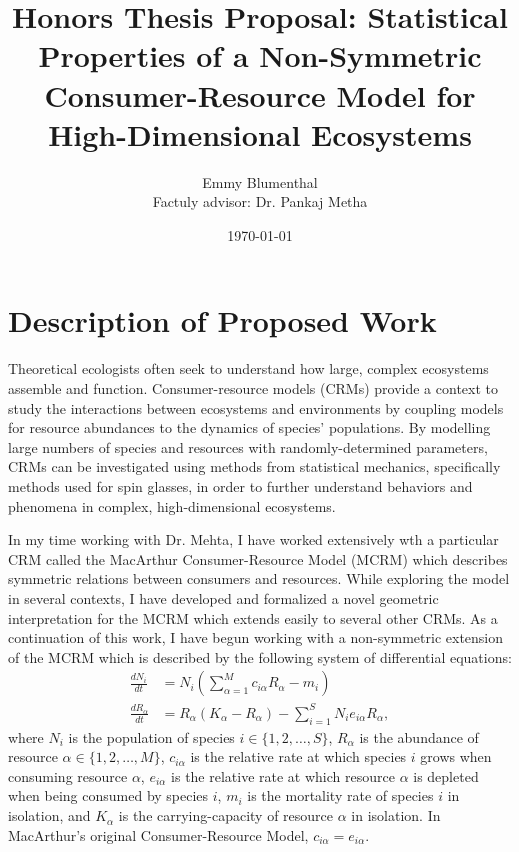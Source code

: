 \documentclass[letterpaper,12pt]{article}
\begin{document}
\title{Honors Thesis Proposal: Statistical Properties of a Non-Symmetric Consumer-Resource Model for High-Dimensional Ecosystems}
\author{
Emmy Blumenthal\\
Factuly advisor: Dr. Pankaj Metha
}
\date{\today}
\maketitle



\section*{Description of Proposed Work}

Theoretical ecologists often seek to understand how large, complex ecosystems assemble and function. 
Consumer-resource models (CRMs) provide a context to study the interactions between ecosystems and environments by coupling models for resource abundances to the dynamics of species' populations.
By modelling large numbers of species and resources with randomly-determined parameters, CRMs can be investigated using methods from statistical mechanics, specifically methods used for spin glasses, in order to further understand behaviors and phenomena in complex, high-dimensional ecosystems.

In my time working with Dr. Mehta, I have worked extensively wth a particular CRM called the MacArthur Consumer-Resource Model (MCRM) which describes symmetric relations between consumers and resources.
While exploring the model in several contexts, I have developed and formalized a novel geometric interpretation for the MCRM which extends easily to several other CRMs.
As a continuation of this work, I have begun working with a non-symmetric extension of the MCRM which is described by the following system of differential equations:
\begin{align}
    \frac{dN_i}{dt}
    &=
    N_i
    \left(
    \sum_{\alpha = 1}^M
    c_{i\alpha} R_\alpha - m_i
    \right)
    \\
    \frac{dR_\alpha}{dt}
    &=
    R_\alpha(K_\alpha - R_\alpha)
    -
    \sum_{i=1}^S
    N_i e_{i\alpha} R_\alpha,
\end{align}
where $N_i$ is the population of species $i \in \{1,2,\dots,S\}$, $R_\alpha$ is the abundance of resource $\alpha \in \{1,2,\dots,M\}$, $c_{i\alpha}$ is the relative rate at which species $i$ grows when consuming resource $\alpha$, $e_{i\alpha}$ is the relative rate at which resource $\alpha$ is depleted when being consumed by species $i$, $m_i$ is the mortality rate of species $i$ in isolation, and $K_\alpha$ is the carrying-capacity of resource $\alpha$ in isolation.
In MacArthur's original Consumer-Resource Model, $c_{i\alpha} = e_{i\alpha}$.
\end{document}

